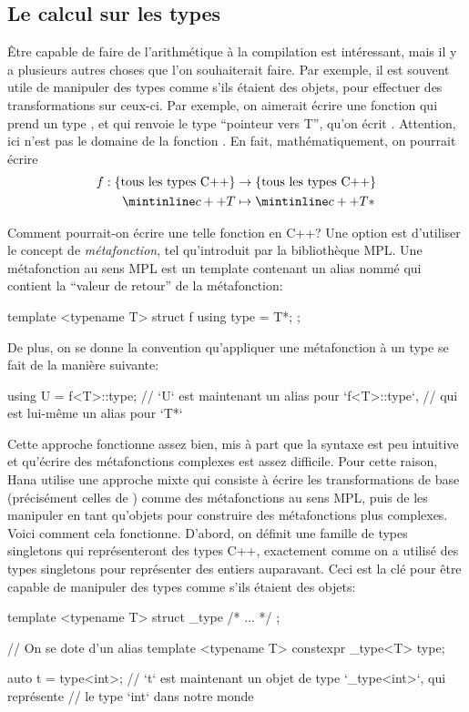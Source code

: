 \subsection{Le calcul sur les types}
Être capable de faire de l'arithmétique à la compilation est intéressant, mais
il y a plusieurs autres choses que l'on souhaiterait faire. Par exemple, il
est souvent utile de manipuler des types comme s'ils étaient des objets, pour
effectuer des transformations sur ceux-ci. Par exemple, on aimerait écrire
une fonction  qui prend un type , et qui renvoie le type
``pointeur vers T'', qu'on écrit . Attention, ici  n'est pas le
domaine de la fonction . En fait, mathématiquement, on pourrait écrire
\begin{align*}
    f : \{\text{tous les types C++}\} &\to \{\text{tous les types C++}\}\\
                             \cc{T} &\mapsto \cc{T*}
\end{align*}

Comment pourrait-on écrire une telle fonction en C++? Une option est d'utiliser
le concept de \textit{métafonction}, tel qu'introduit par la bibliothèque MPL.
Une métafonction au sens MPL est un template contenant un alias nommé
 qui contient la ``valeur de retour'' de la métafonction:
\begin{cpp}
    template <typename T>
    struct f {
        using type = T*;
    };
\end{cpp}

De plus, on se donne la convention qu'appliquer une métafonction  à
un type  se fait de la manière suivante:
\begin{cpp}
    using U = f<T>::type;
    // `U` est maintenant un alias pour `f<T>::type`,
    // qui est lui-même un alias pour `T*`
\end{cpp}

Cette approche fonctionne assez bien, mis à part que la syntaxe est peu
intuitive et qu'écrire des métafonctions complexes est assez difficile.
Pour cette raison, Hana utilise une approche mixte qui consiste à écrire les
transformations de base (précisément celles de ) comme des
métafonctions au sens MPL, puis de les manipuler en tant qu'objets pour
construire des métafonctions plus complexes. Voici comment cela fonctionne.
D'abord, on définit une famille de types singletons qui représenteront des types
C++, exactement comme on a utilisé des types singletons pour représenter des
entiers auparavant. Ceci est la clé pour être capable de manipuler des types
comme s'ils étaient des objets:
\begin{cpp}
    template <typename T>
    struct _type { /* ... */ };

    // On se dote d'un alias
    template <typename T>
    constexpr _type<T> type{};

    auto t = type<int>;
    // `t` est maintenant un objet de type `_type<int>`, qui représente
    // le type `int` dans notre monde
\end{cpp}

